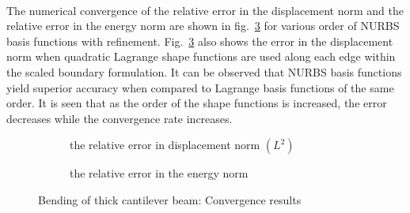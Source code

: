 \paragraph{}
The numerical convergence of the relative error in the displacement norm and the relative error in the energy norm are
    shown in fig.~\ref{fig:cantilever_beam_convergence} for various order of NURBS basis functions with refinement.
Fig.~\ref{fig:cantilever_beam_convergence} also shows the error in the displacement norm when quadratic Lagrange shape
    functions are used along each edge within the scaled boundary formulation.
It can be observed that NURBS basis functions yield superior accuracy when compared to Lagrange basis functions of the
    same order.
It is seen that as the order of the shape functions is increased, the error decreases while the convergence rate increases.

\begin{figure}
    \begin{subfigure}[b]{1\linewidth}
        \centering
        \scalebox{0.7}{
            
        }
        \label{fig:cantilever_beam_displacement_convergence}
        \caption{the relative error in displacement norm $(L^2)$}
    \end{subfigure}
    
    \begin{subfigure}[b]{1\linewidth}
        \centering
        \scalebox{0.7}{
            
        }
        \label{fig:cantilever_beam_energy_convergence}
        \caption{the relative error in the energy norm}
    \end{subfigure}
\caption{Bending of thick cantilever beam: Convergence results}
\label{fig:cantilever_beam_convergence}
\end{figure}

\pagebreak